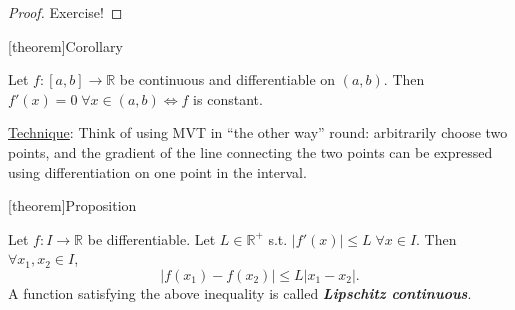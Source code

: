 \documentclass[12pt]{report}
\theoremstyle{definition}
\begin{document}
\begin{proof}
    Exercise!
\end{proof}

[theorem]{Corollary}
\begin{f is constant then gradient is 0}
    Let $f:[a,b]\rightarrow{}\mathbb{R}$ be continuous and differentiable on $(a,b)$.
    Then $f'(x) = 0 \;\forall x \in (a,b) \iff f$ is constant.
\end{f is constant then gradient is 0}

\underline{Technique}: Think of using MVT in ``the other way'' round: 
arbitrarily choose two points,
and the gradient of the line connecting the two points can be expressed using
differentiation on one point in the interval.

[theorem]{Proposition}
\begin{Lipschitz continuous}
    Let $f:I\rightarrow{}\mathbb{R}$ be differentiable.
    Let $L\in \mathbb{R}^{+}$ s.t. $|f'(x)|\le L \;\forall x \in I$.
    Then $\forall x_1, x_2\in I$,\[
        |f(x_1) - f(x_2)| \le L|x_1 - x_2|.
    \]
    A function satisfying the above inequality is called \textbf{\emph{Lipschitz continuous}}.
\end{Lipschitz continuous}








\end{document}
